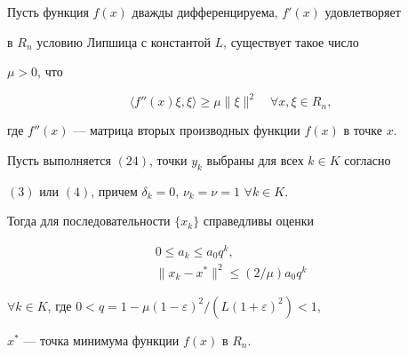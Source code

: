 \begin{thm}


Пусть функция $f(x)$ дважды дифференцируема, ${f}'(x)$ удовлетворяет


в $R_n$ условию Липшица с константой $L$, существует такое число


$\mu >0$, что 


\begin{equation}


\langle f''(x)\xi,\xi\rangle\ge \mu \|\xi\|^2\quad \forall x,\xi \in R_n,


\end{equation}


где ${f}''(x)$ --- матрица вторых производных функции $f(x)$ в точке $x$. 


Пусть выполняется $(24)$, точки $y_k$ выбраны для всех $k\in K$ согласно


$(3)$ или $(4)$, причем $\delta_k=0$, $\nu_k=\nu =1$ $\forall k\in K$.


Тогда для последовательности $\{x_k\} $ справедливы оценки


\begin{gather}


0\leq a_k\leq a_0q^k, \\


\|{x_k-x^{*}} \|^2 \leq (2/\mu )a_0q^k


\end{gather}


$\forall k\in K$, где $0<q=1-\mu(1-\varepsilon)^2/(L(1+\varepsilon)^2)<1$,


$x^*$ --- точка минимума функции $f(x)$ в $R_n$. 


\end{thm}





